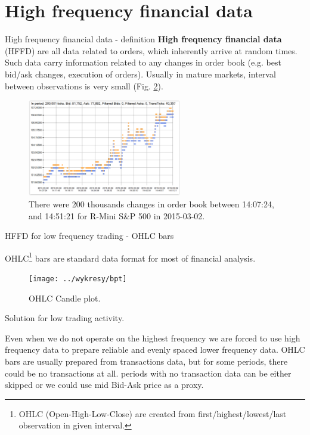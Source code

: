 \documentclass{beamer}
\begin{document}
\section{High frequency financial data}

\begin{frame}{High frequency financial data - definition}
\small
\textbf{High frequency financial data} (HFFD) are all data related to orders, which inherently arrive at random times. Such data carry information related to any changes in order book (e.g. best bid/ask changes, execution of orders). Usually in mature markets, interval between observations is very small (Fig. \ref{fig:esh}).

\begin{figure}
    \centering
    \includegraphics[width=0.6\textwidth]{../wykresy/fESH.PNG}
    \caption{There were 200 thousands changes in order book between 14:07:24, and 14:51:21 for R-Mini S\&P 500 in 2015-03-02. }
    \label{fig:esh}
\end{figure}

\end{frame}

\begin{frame}{HFFD for low frequency trading - OHLC bars}

OHLC\footnote{OHLC (Open-High-Low-Close) are created from first/highest/lowest/last observation in given interval.} bars are standard data format for most of financial analysis.


\begin{figure}
    \centering
    \texttt{[image: ../wykresy/bpt]}
    \caption{OHLC Candle plot.}
    \label{fig:esh}
\end{figure}

\end{frame}

\begin{frame}{Solution for low trading activity.}

Even when we do not operate on the highest frequency we are forced to use high frequency data to prepare reliable and evenly spaced lower frequency data. OHLC bars are usually prepared from transactions data, but for some periods, there could be no transactions at all. periods with no transaction data can be either skipped or we could use mid Bid-Ask price as a proxy.

\end{frame}
\end{document}
